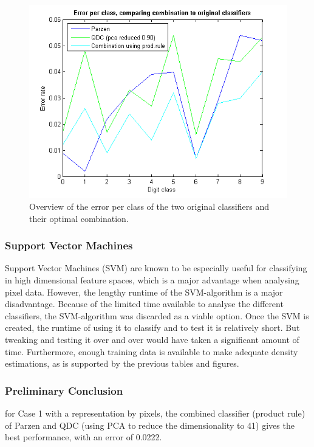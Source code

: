 \begin{figure}[H]
	\centering
	\includegraphics[scale=0.8]{images/pr_figure_4.png}
	\caption{Overview of the error per class of the two original classifiers and their optimal combination.}
	\label{fig:errorpdigit3}
\end{figure}
\subsubsection*{Support Vector Machines}
Support Vector Machines (SVM) are known to be especially useful for classifying in high dimensional feature spaces, which is a major advantage when analysing pixel data. However, the lengthy runtime of the SVM-algorithm is a major disadvantage. Because of the limited time available to analyse the different classifiers, the SVM-algorithm was discarded as a viable option. Once the SVM is created, the runtime of using it to classify and to test it is relatively short. But tweaking and testing it over and over would have taken a significant amount of time. Furthermore, enough training data is available to make adequate density estimations, as is supported by the previous tables and figures.

\subsubsection*{Preliminary Conclusion} for Case 1 with a representation by pixels, the combined classifier (product rule) of Parzen and QDC (using PCA to reduce the dimensionality to 41) gives the best performance, with an error of 0.0222.

